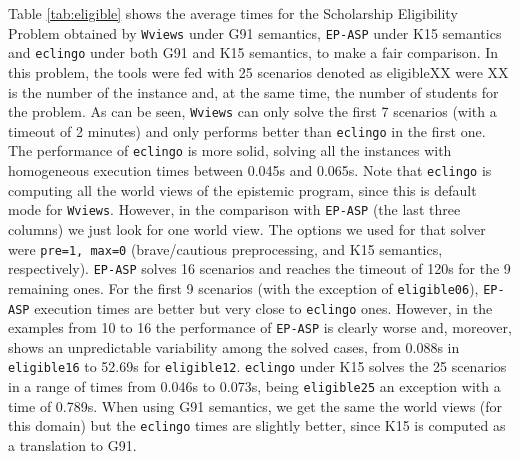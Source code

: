\documentclass{new_tlp}
\def\eclingo{{\tt eclingo}}
\def\wviews{{\tt Wviews}}
\def\wviews{{\tt Wviews}}
\def\EPASP{{\tt EP-ASP}}
\begin{document}
Table \ref{tab:eligible} shows the average times for the Scholarship Eligibility Problem obtained by \wviews{} under G91 semantics, \EPASP{} under K15 semantics and \eclingo{} under both G91 and K15 semantics, to make a fair comparison. 
%
In this problem, the tools were fed with 25 scenarios denoted as eligibleXX were XX is the number of the instance and, at the same time, the number of students for the problem. 
%
As can be seen, \wviews{} can only solve the first 7 scenarios (with a timeout of 2 minutes) and only performs better than \eclingo{} in the first one. 
%
The performance of \eclingo{} is more solid, solving all the instances with homogeneous execution times between 0.045s and 0.065s. 
%
Note that \eclingo{} is computing all the world views of the epistemic program, since this is default mode for \wviews{}.
%
However, in the comparison with \EPASP{} (the last three columns) we just look for one world view.
%
The options we used for that solver were {\tt  pre=1, max=0} (brave/cautious preprocessing, and K15 semantics, respectively).
%
\EPASP{} solves 16 scenarios and reaches the timeout of 120s for the 9 remaining ones. For the first 9 scenarios (with the exception of {\tt eligible06}), \EPASP{} execution times are better but very close to \eclingo{} ones. However, in the examples from 10 to 16 the performance of \EPASP{} is clearly worse and, moreover, shows an unpredictable variability among the solved cases, from 0.088s in {\tt eligible16} to 52.69s for {\tt eligible12}. \eclingo{} under K15 solves the 25 scenarios in a range of times from 0.046s to 0.073s, being {\tt eligible25} an exception with a time of 0.789s.
When using G91 semantics, we get the same the world views (for this domain) but the \eclingo{} times are slightly better, since K15 is computed as a translation to G91.
\end{document}
